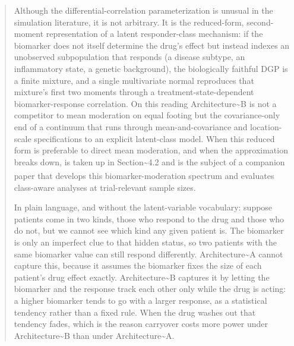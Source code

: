 \documentclass[
  11pt,
]{article}
\newenvironment{orig}{%
  \begin{quote}\normalsize\color[gray]{0.55}}{%
  \end{quote}}
\begin{document}
\begin{orig}
Although the differential-correlation parameterization is unusual in the
simulation literature, it is not arbitrary. It is the reduced-form,
second-moment representation of a latent responder-class mechanism: if
the biomarker does not itself determine the drug's effect but instead
indexes an unobserved subpopulation that responds (a disease subtype, an
inflammatory state, a genetic background), the biologically faithful DGP
is a finite mixture, and a single multivariate normal reproduces that
mixture's first two moments through a treatment-state-dependent
biomarker-response correlation. On this reading
Architecture\textasciitilde B is not a competitor to mean moderation on
equal footing but the covariance-only end of a continuum that runs
through mean-and-covariance and location-scale specifications to an
explicit latent-class model. When this reduced form is preferable to
direct mean moderation, and when the approximation breaks down, is taken
up in Section\textasciitilde4.2 and is the subject of a companion
paper\textsuperscript{} that
develops this biomarker-moderation spectrum and evaluates class-aware
analyses at trial-relevant sample sizes.

In plain language, and without the latent-variable vocabulary: suppose
patients come in two kinds, those who respond to the drug and those who
do not, but we cannot see which kind any given patient is. The biomarker
is only an imperfect clue to that hidden status, so two patients with
the same biomarker value can still respond differently.
Architecture\textasciitilde A cannot capture this, because it assumes
the biomarker fixes the size of each patient's drug effect exactly.
Architecture\textasciitilde B captures it by letting the biomarker and
the response track each other only while the drug is acting: a higher
biomarker tends to go with a larger response, as a statistical tendency
rather than a fixed rule. When the drug washes out that tendency fades,
which is the reason carryover costs more power under
Architecture\textasciitilde B than under Architecture\textasciitilde A.

\end{orig}
\end{document}
